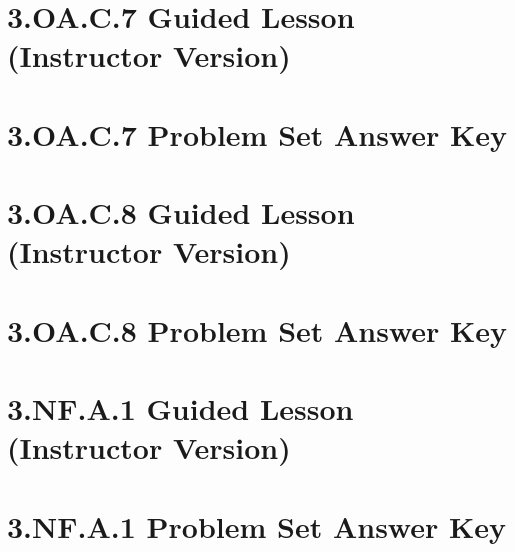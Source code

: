 \documentclass[a4paper,12pt]{article}
\begin{document}
\newpage
\section{3.OA.C.7 Guided Lesson (Instructor Version)}


\newpage
\section{3.OA.C.7 Problem Set Answer Key}


\newpage
\section{3.OA.C.8 Guided Lesson (Instructor Version)}


\newpage
\section{3.OA.C.8 Problem Set Answer Key}


\newpage
\section{3.NF.A.1 Guided Lesson (Instructor Version)}


\newpage
\section{3.NF.A.1 Problem Set Answer Key}

\end{document}
